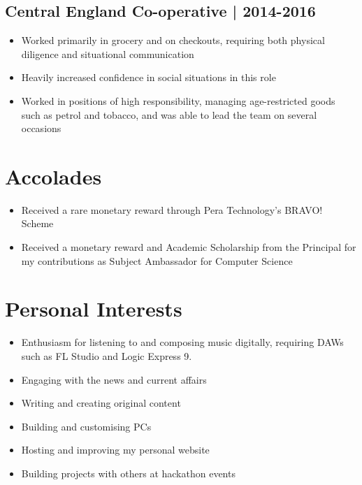 \documentclass{article}
\begin{document}
\subsection*{Central England Co-operative | 2014-2016}
\begin{itemize}
\item Worked primarily in grocery and on checkouts, requiring both physical diligence and situational communication
\item Heavily increased confidence in social situations in this role
\item Worked in positions of high responsibility, managing age-restricted goods such as petrol and tobacco, and was able to lead the team on several occasions
\end{itemize}
\section*{Accolades}
\begin{itemize}
\item Received a rare monetary reward through Pera Technology's BRAVO! Scheme
\item Received a monetary reward and Academic Scholarship from the Principal for my contributions as Subject Ambassador for Computer Science
\end{itemize}
\section*{Personal Interests}
\begin{itemize}
\item Enthusiasm for listening to and composing music digitally, requiring DAWs such as FL Studio and Logic Express 9.
\item Engaging with the news and current affairs
\item Writing and creating original content
\item Building and customising PCs
\item Hosting and improving my personal website
\item Building projects with others at hackathon events
\end{itemize}
\end{document}
